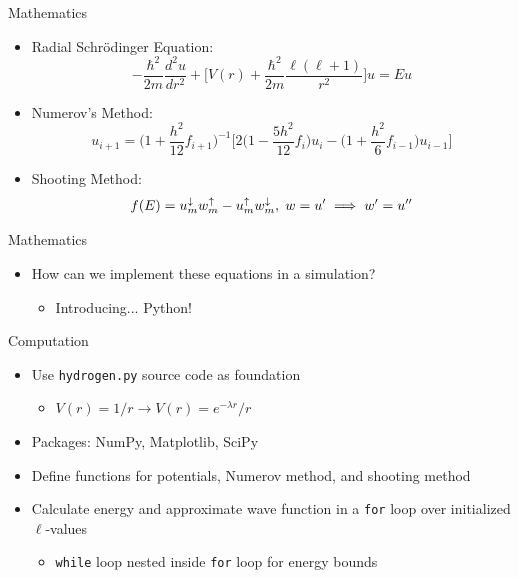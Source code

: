 \documentclass{beamer}
\begin{document}
\begin{frame}{Mathematics}
    \begin{itemize}[<+-| alert@+>]
        \item Radial Schr\"odinger Equation: \[-\frac{\hbar^2}{2m} \frac{d^2 u}{dr^2} + \bigg[V(r) + \frac{\hbar^2}{2m} \frac{\ell (\ell + 1)}{r^2} \bigg]u = Eu\]
        
        \item Numerov's Method: \[u_{i+1} = \Big(1 + \frac{h^2}{12}f_{i+1} \Big)^{-1} \Big[2 \Big(1 - \frac{5 h^2}{12}f_i \Big)u_i - \Big(1 + \frac{h^2}{6}f_{i-1} \Big)u_{i-1}\Big]\] 
        
        \item Shooting Method: \[f(E) = u_m^\downarrow w_m^\uparrow - u_m^\uparrow w_m^\downarrow, \hspace{.1cm} w = u' \implies w' = u''\]
        
    \end{itemize}
\end{frame}

\begin{frame}{Mathematics}
    \begin{itemize}[<+-| alert@+>]
        \item How can we implement these equations in a simulation?
        \begin{itemize}[<+-| alert@+>]
            \item Introducing... Python!
        \end{itemize}
    \end{itemize}
\end{frame}

\begin{frame}{Computation}
    \begin{itemize}[<+-| alert@+>]
        \item {Use \texttt{hydrogen.py} %
        source code as foundation}
        \begin{itemize}
            \item $V(r) = 1/r \rightarrow V(r) = e^{-\lambda r}/r$
        \end{itemize}
        \item Packages: NumPy, Matplotlib, SciPy
        \item Define functions for potentials, Numerov method, and shooting method
        \item Calculate energy and approximate wave function in a \texttt{for} loop over initialized $\ell$-values
        \begin{itemize}
            \item \texttt{while} loop nested inside \texttt{for} loop for energy bounds
        \end{itemize}
    \end{itemize}
\end{frame}
\end{document}
